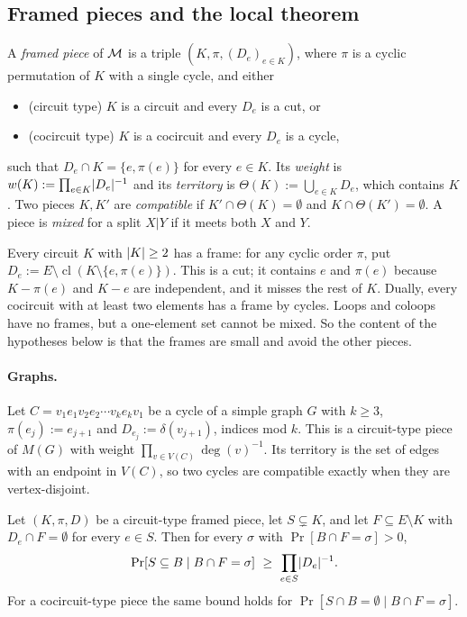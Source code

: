 \subsection{Framed pieces and the local theorem}

\begin{definition}\label{def:frame}
A \emph{framed piece} of $\mathcal{M}$ is a triple $(K,\pi,(D_e)_{e\in K})$, where $\pi$ is a cyclic permutation of $K$ with a single cycle, and either
\begin{itemize}
\item (circuit type) $K$ is a circuit and every $D_e$ is a cut, or
\item (cocircuit type) $K$ is a cocircuit and every $D_e$ is a cycle,
\end{itemize}
such that $D_e\cap K=\{e,\pi(e)\}$ for every $e\in K$. Its \emph{weight} is $w(K):=\prod_{e\in K}\lvert D_e\rvert^{-1}$ and its \emph{territory} is $\Theta(K):=\bigcup_{e\in K}D_e$, which contains $K$. Two pieces $K,K'$ are \emph{compatible} if $K'\cap\Theta(K)=\emptyset$ and $K\cap\Theta(K')=\emptyset$. A piece is \emph{mixed} for a split $X|Y$ if it meets both $X$ and $Y$.
\end{definition}

Every circuit $K$ with $\lvert K\rvert\ge2$ has a frame: for any cyclic order $\pi$, put $D_e:=E\setminus\operatorname{cl}(K\setminus\{e,\pi(e)\})$. This is a cut; it contains $e$ and $\pi(e)$ because $K-\pi(e)$ and $K-e$ are independent, and it misses the rest of $K$. Dually, every cocircuit with at least two elements has a frame by cycles. Loops and coloops have no frames, but a one-element set cannot be mixed. So the content of the hypotheses below is that the frames are small and avoid the other pieces.

\paragraph{Graphs.} Let $C=v_1e_1v_2e_2\cdots v_ke_kv_1$ be a cycle of a simple graph $G$ with $k\ge3$, $\pi(e_j):=e_{j+1}$ and $D_{e_j}:=\delta(v_{j+1})$, indices mod $k$. This is a circuit-type piece of $M(G)$ with weight $\prod_{v\in V(C)}\deg(v)^{-1}$. Its territory is the set of edges with an endpoint in $V(C)$, so two cycles are compatible exactly when they are vertex-disjoint.

\begin{lemma}\label{lem:mat-frame}
Let $(K,\pi,D)$ be a circuit-type framed piece, let $S\subsetneq K$, and let $F\subseteq E\setminus K$ with $D_e\cap F=\emptyset$ for every $e\in S$. Then for every $\sigma$ with $\Pr[B\cap F=\sigma]>0$,
\[
  \Pr[S\subseteq B\mid B\cap F=\sigma]\ \ge\ \prod_{e\in S}\abs{D_e}^{-1} .
\]
For a cocircuit-type piece the same bound holds for $\Pr[S\cap B=\emptyset\mid B\cap F=\sigma]$.
\end{lemma}

